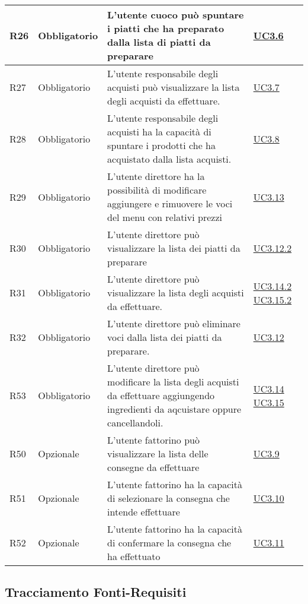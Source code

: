 \begin{longtable}{|P{1.5cm}|P{3cm}|P{6cm}|P{2.5cm}|}
	\hline R26 & Obbligatorio & L’utente cuoco può spuntare i piatti che ha preparato dalla lista di piatti da preparare  & \hyperref[UC3.6]{UC3.6} \\
	\hline R27 & Obbligatorio & L’utente responsabile degli acquisti può visualizzare la lista degli acquisti da effettuare. & \hyperref[UC3.7]{UC3.7} \\
	\hline R28 & Obbligatorio & L’utente responsabile degli acquisti ha la capacità di spuntare i prodotti che ha acquistato dalla lista acquisti.
	 & \hyperref[UC3.8]{UC3.8} \\
	\hline R29 & Obbligatorio & L’utente direttore ha la possibilità di modificare aggiungere e rimuovere le voci del menu con relativi prezzi & \hyperref[UC3.13]{UC3.13} \\
	\hline R30 & Obbligatorio & L’utente direttore può visualizzare la lista dei piatti da preparare & \hyperref[UC3.12.2]{UC3.12.2} \\
	\hline R31 & Obbligatorio & L’utente direttore può visualizzare la lista degli acquisti da effettuare. & \hyperref[UC3.14.2]{UC3.14.2} \hyperref[UC3.15.2]{UC3.15.2} \\
	\hline R32 & Obbligatorio & L’utente direttore può eliminare voci dalla lista dei piatti da preparare. & \hyperref[UC3.12]{UC3.12} \\
	\hline R53 & Obbligatorio & L’utente direttore può modificare la lista degli acquisti da effettuare aggiungendo ingredienti da aqcuistare oppure cancellandoli.
	 & \hyperref[UC3.14]{UC3.14} \linebreak \hyperref[UC3.15]{UC3.15} \\	 
	\hline R50 & Opzionale & L’utente fattorino può visualizzare la lista delle consegne da effettuare & \hyperref[UC3.9]{UC3.9} \\
	\hline R51 & Opzionale & L’utente fattorino ha la capacità di selezionare la consegna che intende effettuare & \hyperref[UC3.10]{UC3.10} \\
	\hline R52 & Opzionale & L’utente fattorino ha la capacità di confermare la consegna che ha effettuato & \hyperref[UC3.11]{UC3.11} \\
	\hline
\end{longtable}

\subsection{Tracciamento Fonti-Requisiti}

